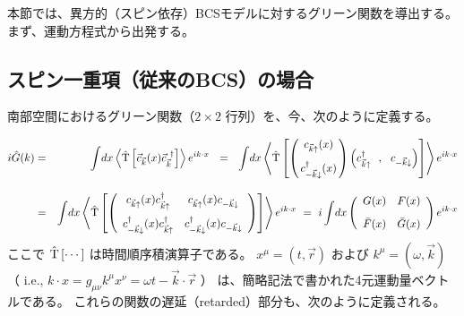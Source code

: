 \documentclass[uplatex,a4j,12pt,dvipdfmx]{jsarticle}
\begin{document}
本節では、異方的（スピン依存）BCSモデルに対するグリーン関数を導出する。
まず、運動方程式から出発する。
\subsection{スピン一重項（従来のBCS）の場合}

南部空間におけるグリーン関数（$2 \times 2$ 行列）を、今、次のように定義する。

\begin{eqnarray}
	i \hat{G}(k)
	&=&
	\int \! dx
	\left\langle \hat{\rm T} \left[ \vec{c}_{\vec{k}}(x) \vec{c}_{\vec{k}}^{\ \dagger} \right] \right\rangle
	e^{ i k \cdot x }
	\ \ = \ \
	\int \! dx
	\left\langle \hat{\rm T} \left[
		\left(
		\!\!
		\begin{array}{c}
				c_{\vec{k} \uparrow}(x)
				\\[3mm]
				c_{-\vec{k} \downarrow}^{\dagger}(x)
			\end{array}
		\!\!
		\right)
		\left( c_{\vec{k} \uparrow}^{\dagger} \ \ , \ \ c_{-\vec{k} \downarrow} \right)
		\right]
	\right\rangle
	e^{ i k \cdot x }
	\nonumber \\[3mm] &=&
	\int \! dx
	\left\langle \hat{\rm T} \left[
		\left(
		\begin{array}{cc}
			c_{\vec{k}\uparrow}(x) c_{\vec{k}\uparrow}^{\dagger}              & c_{\vec{k}\uparrow}(x) c_{-\vec{k}\downarrow}
			\\[3mm]
			c_{-\vec{k}\downarrow}^{\dagger}(x) c_{\vec{k}\uparrow}^{\dagger} & c_{-\vec{k}\downarrow}^{\dagger}(x) c_{-\vec{k}\downarrow}
		\end{array}
		\right)
		\right] \right\rangle
	e^{ i k \cdot x }
	\ = \
	i
	\int \! dx
	\left(
	\begin{array}{cc}
			G(x)       & F(x)
			\\[3mm]
			\bar{F}(x) & \bar{G}(x)
		\end{array}
	\right)
	e^{ i k \cdot x }
\end{eqnarray}
%
ここで $\hat{\rm T} \left[ \cdots \right]$ は時間順序積演算子である。
$x^{\mu}=(t,\vec{r})$ および $k^{\mu}=(\omega,\vec{k})$
（ i.e., $k \cdot x = g_{\mu \nu} k^{\mu} x^{\nu} = \omega t- \vec{k} \cdot \vec{r}$ ）
は、簡略記法で書かれた4元運動量ベクトルである。
これらの関数の遅延（retarded）部分も、次のように定義される。
\end{document}
